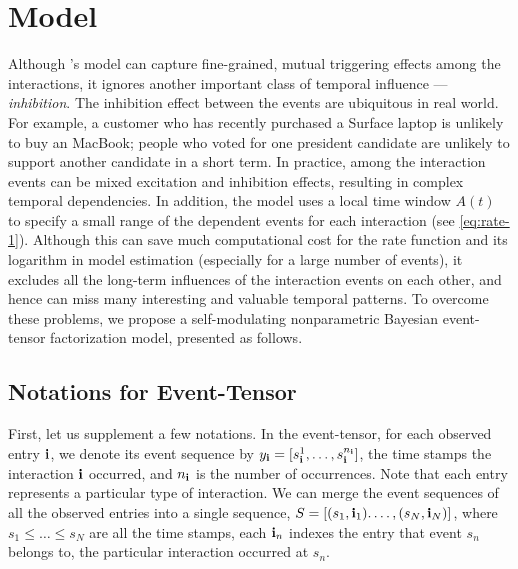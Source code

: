 \section{Model}
Although \citet{zhe2018stochastic}'s model can capture fine-grained, mutual triggering effects among the interactions, it ignores another important class of temporal influence --- \textit{inhibition}. The inhibition effect between the events are ubiquitous in real world. For example, a customer who has recently purchased a Surface laptop is unlikely to buy an MacBook; people who voted for one president candidate are unlikely to support another candidate in a short term. In practice, among the interaction events can be mixed excitation and inhibition effects, resulting in complex temporal dependencies. In addition, the model uses a local time window $A(t)$ to specify a small range of the dependent events for each interaction (see \eqref{eq:rate-1}). Although this can save much computational cost for the rate function and its logarithm in model estimation (especially for a large number of events),  it excludes all the long-term  influences of the interaction events on each other, and hence can miss many interesting and valuable temporal patterns. To overcome these problems, we propose a self-modulating nonparametric Bayesian event-tensor factorization model, presented as follows.

\subsection{Notations for Event-Tensor}

First, let us supplement a few notations. In the event-tensor, for each observed entry ${\bf i}$, we denote its event sequence by $y_{{\bf i}} = [s_{\bf i}^1, \ldots, s_{\bf i}^{n_{\bf i}}]$, \ie the time stamps the interaction ${\bf i}$ occurred, and $n_{\bf i}$ is the number of occurrences. Note that each entry represents a particular type of interaction. We can merge the event sequences of all the observed entries into a single sequence, $S = [(s_1, {\bf i}_1). \ldots, (s_N, {\bf i}_N)]$, where $s_1 \le \ldots \le s_N$ are all the time stamps, each ${\bf i}_n$  indexes the entry that event $s_n$ belongs to, \ie the particular interaction occurred at $s_n$. 
